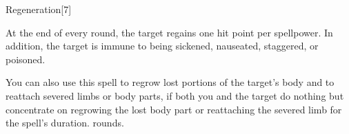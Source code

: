 \begin{spellsection}{Regeneration}[7]
    \begin{spellheader}
    \end{spellheader}
    \begin{spellcontent}
        \begin{spelltargetinginfo}
        \end{spelltargetinginfo}
        \begin{spelleffects}
            \spelleffect At the end of every round, the target regains one hit point per spellpower. In addition, the target is immune to being sickened, nauseated, staggered, or poisoned.

            \par You can also use this spell to regrow lost portions of the target's body and to reattach severed limbs or body parts, if both you and the target do nothing but concentrate on regrowing the lost body part or reattaching the severed limb for the spell's duration.
             rounds.
        \end{spelleffects}
    \end{spellcontent}
    \begin{spellfooter}
        \miscastexplode
    \end{spellfooter}
\end{spellsection}

